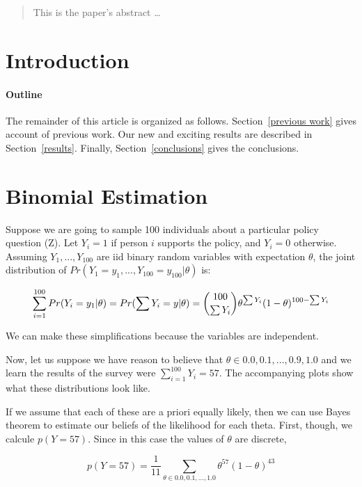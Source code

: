 \documentclass[12pt]{article}
\begin{document}
\maketitle

\begin{abstract}
This is the paper's abstract \ldots
\end{abstract}

\section{Introduction}

\paragraph{Outline}
The remainder of this article is organized as follows.
Section~\ref{previous work} gives account of previous work.
Our new and exciting results are described in Section~\ref{results}.
Finally, Section~\ref{conclusions} gives the conclusions.

\section{Binomial Estimation}\label{samplesurvey}
Suppose we are going to sample 100 individuals about a particular policy question (Z). Let $Y_i=1$ if person $i$
supports the policy, and $Y_i=0$ otherwise. Assuming $Y_1,...,Y_100$ are iid binary random variables with expectation
$\theta$, the joint distribution of $Pr(Y_1=y_1,...,Y_{100}=y_{100}|\theta)$ is:

$$
\sum_{i=1}^{100} Pr(Y_i=y_1|\theta) \\
=Pr(\sum Y_i=y|\theta) \\
={100 \choose \sum Y_i}\theta^{\sum Y_i}(1-\theta)^{100-\sum Y_i}
$$

We can make these simplifications because the variables are independent.

Now, let us suppose we have reason to believe that $\theta \in {0.0,0.1,...,0.9,1.0}$ and we learn the results of the
survey were $\sum_{i=1}^{100}Y_i=57$. The accompanying plots show what these distributions look like.

If we assume that each of these are a priori equally likely, then we can use Bayes theorem to estimate our beliefs of the likelihood for each theta. First, though, we calcule $p(Y=57)$. Since in this case the values of $\theta$ are discrete,

$$
p(Y=57)=\frac{1}{11}\sum_{\theta \in {0.0,0.1,...,1.0}} \theta^{57}(1-\theta)^{43}
$$
\end{document}
